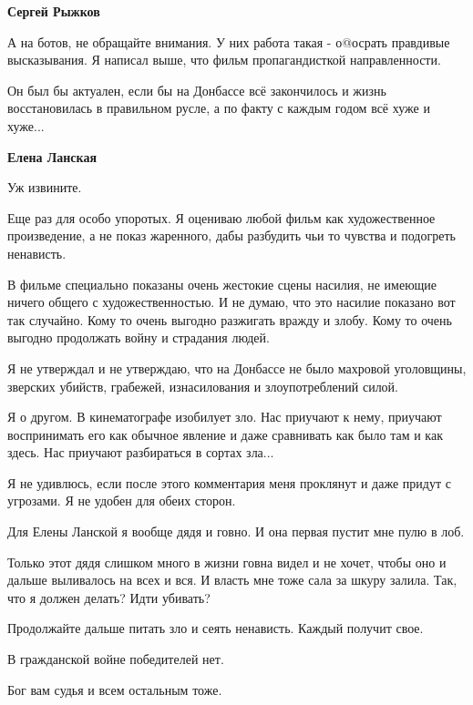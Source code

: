 \begin{itemize}
\begin{itemize}
\textbf{Сергей Рыжков}

А на ботов, не обращайте внимания. У них работа такая - о@осрать правдивые
высказывания. Я написал выше, что фильм пропагандисткой направленности.

Он был бы актуален, если бы на Донбассе всё закончилось и жизнь восстановилась
в правильном русле, а по факту с каждым годом всё хуже и хуже...

 
\textbf{Елена Ланская} 

Уж извините.

Еще раз для особо упоротых. Я оцениваю любой фильм как художественное
произведение, а не показ жаренного, дабы разбудить чьи то чувства и подогреть
ненависть.

В фильме специально показаны очень жестокие сцены насилия, не имеющие ничего
общего с художественностью. И не думаю, что это насилие показано вот так
случайно. Кому то очень выгодно разжигать вражду и злобу. Кому то очень выгодно
продолжать войну и страдания людей.

Я не утверждал и не утверждаю, что на Донбассе не было махровой уголовщины,
зверских убийств, грабежей, изнасилования и злоупотреблений силой.

Я о другом. В кинематографе изобилует зло. Нас приучают к нему, приучают
воспринимать его как обычное явление и даже сравнивать как было там и как
здесь. Нас приучают разбираться в сортах зла...

Я не удивлюсь, если после этого комментария меня проклянут и даже придут с
угрозами. Я не удобен для обеих сторон.

Для Елены Ланской я вообще дядя и говно. И она первая пустит мне пулю в лоб.

Только этот дядя слишком много в жизни говна видел и не хочет, чтобы оно и
дальше выливалось на всех и вся. И власть мне тоже сала за шкуру залила. Так,
что я должен делать? Идти убивать?

Продолжайте дальше питать зло и сеять ненависть. Каждый получит свое.

В гражданской войне победителей нет.

Бог вам судья и всем остальным тоже.

 

\end{itemize}
\end{itemize}

